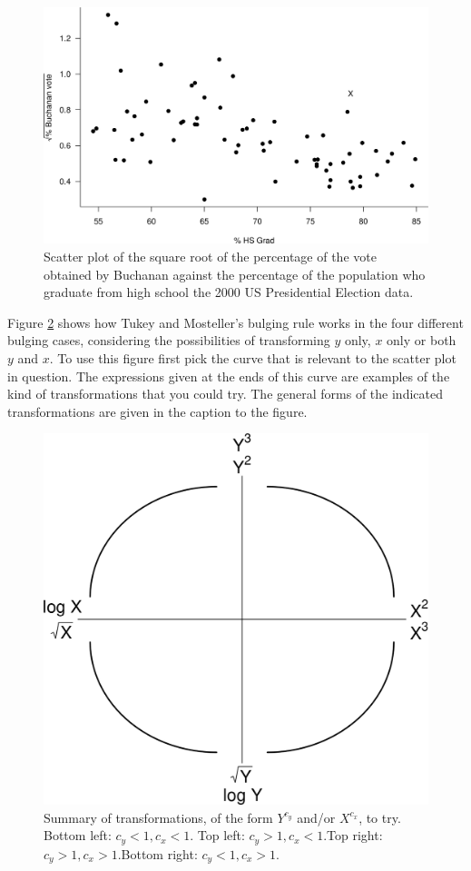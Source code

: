 \documentclass[
  11pt,
  british,
  openany, a4paper]{book}
\begin{document}
\begin{figure}

{\centering \includegraphics[width=0.75\linewidth]{images/election_HS2} 

}

\caption{Scatter plot of the square root of the percentage of the vote obtained by Buchanan against the percentage of the population who graduate from high school the 2000 US Presidential Election data.}\label{fig:electionHS2}
\end{figure}

Figure \ref{fig:tukey} shows how Tukey and Mosteller's bulging rule works in the four different bulging cases, considering the possibilities of transforming \(y\) only, \(x\) only or both \(y\) and \(x\). To use this figure first pick the curve that is relevant to the scatter plot in question. The expressions given at the ends of this curve are examples of the kind of transformations that you could try. The general forms of the indicated transformations are given in the caption to the figure.

\begin{figure}

{\centering \includegraphics[width=0.75\linewidth]{images/tukey} 

}

\caption{Summary of transformations, of the form $Y^{c_y}$ and/or $X^{c_x}$, to try. Bottom left: $c_y < 1, c_x < 1$. Top left: $c_y > 1, c_x < 1$.Top right: $c_y > 1, c_x > 1$.Bottom right: $c_y < 1, c_x > 1$.}\label{fig:tukey}
\end{figure}
\end{document}
